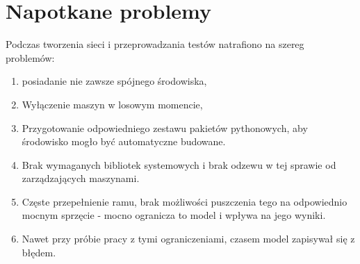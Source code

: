 \section{Napotkane problemy}
    Podczas tworzenia sieci i przeprowadzania testów natrafiono na szereg problemów:
    \begin{enumerate}
        \item posiadanie nie zawsze spójnego środowiska,
        \item Wyłączenie maszyn w losowym momencie,
        \item Przygotowanie odpowiedniego zestawu pakietów pythonowych, aby środowisko mogło być automatyczne budowane.
        \item Brak wymaganych bibliotek systemowych i brak odzewu w tej sprawie od zarządzających maszynami.
        \item Częste przepełnienie ramu, brak możliwości puszczenia tego na odpowiednio mocnym sprzęcie - mocno ogranicza to model i wpływa na jego wyniki.
        \item Nawet przy próbie pracy z tymi ograniczeniami, czasem model zapisywał się z błędem.
    \end{enumerate}

